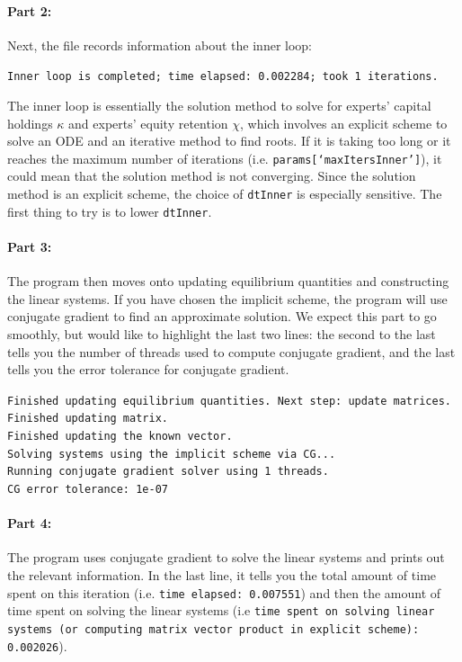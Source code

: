\documentclass[12pt]{article}
\begin{document}
\paragraph{Part 2:} Next, the file records information about the inner loop:

\begin{flushleft}
\texttt{Inner loop is completed; time elapsed: 0.002284; took 1 iterations.}
\end{flushleft}

The inner loop is essentially the solution method to solve for experts' capital holdings $\kappa$ and experts' equity retention $\chi$, which involves an explicit scheme to solve an ODE and an iterative method to find roots. If it is taking too long or it reaches the maximum number of iterations (i.e. \texttt{params[`maxItersInner']}), it could mean that the solution method is not converging. Since the solution method is an explicit scheme, the choice of \texttt{dtInner} is especially sensitive. The first thing to try is to lower \texttt{dtInner}.

\paragraph{Part 3:} The program then moves onto updating equilibrium quantities and constructing the linear systems. If you have chosen the implicit scheme, the program will use conjugate gradient to find an approximate solution. We expect this part to go smoothly, but would like to highlight the last two lines: the second to the last tells you the number of threads used to compute conjugate gradient, and the last tells you the error tolerance for conjugate gradient.
\begin{flushleft}
\texttt{Finished updating equilibrium quantities. Next step: update matrices.\\
Finished updating matrix.\\
Finished updating the known vector.\\
Solving systems using the implicit scheme via CG...\\
Running conjugate gradient solver using 1 threads.\\
CG error tolerance: 1e-07}
\end{flushleft}

\paragraph{Part 4:} The program uses conjugate gradient to solve the linear systems and prints out the relevant information. In the last line, it tells you the total amount of time spent on this iteration (i.e. \texttt{time elapsed: 0.007551}) and then the amount of time spent on solving the linear systems (i.e \texttt{time spent on solving linear systems (or computing matrix vector product in explicit scheme): 0.002026}).
\end{document}
